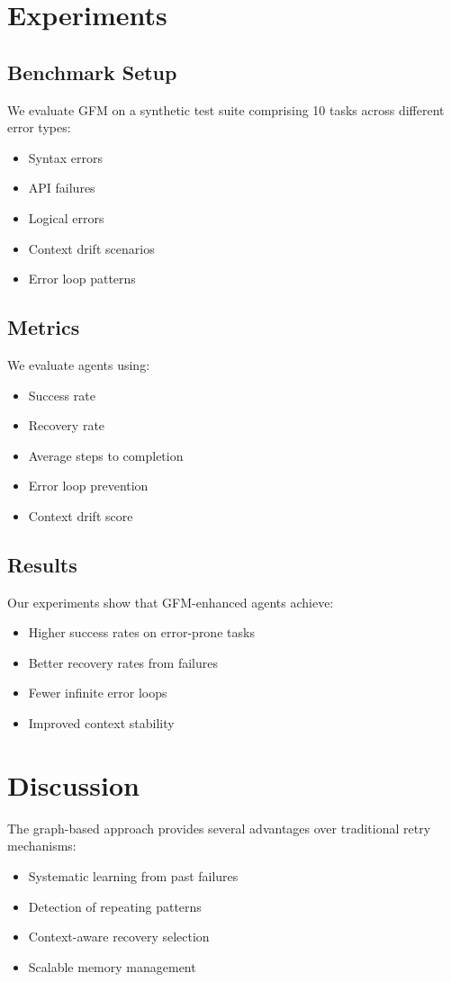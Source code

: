 \documentclass{conference}
\begin{document}
\section{Experiments}

\subsection{Benchmark Setup}
We evaluate GFM on a synthetic test suite comprising 10 tasks across different error types:
\begin{itemize}
    \item Syntax errors
    \item API failures
    \item Logical errors
    \item Context drift scenarios
    \item Error loop patterns
\end{itemize}

\subsection{Metrics}
We evaluate agents using:
\begin{itemize}
    \item Success rate
    \item Recovery rate
    \item Average steps to completion
    \item Error loop prevention
    \item Context drift score
\end{itemize}

\subsection{Results}
Our experiments show that GFM-enhanced agents achieve:
\begin{itemize}
    \item Higher success rates on error-prone tasks
    \item Better recovery rates from failures
    \item Fewer infinite error loops
    \item Improved context stability
\end{itemize}

\section{Discussion}
The graph-based approach provides several advantages over traditional retry mechanisms:
\begin{itemize}
    \item Systematic learning from past failures
    \item Detection of repeating patterns
    \item Context-aware recovery selection
    \item Scalable memory management
\end{itemize}
\end{document}
